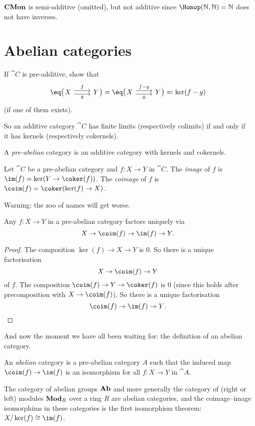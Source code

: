 \documentclass[../main.tex]{subfiles}
\begin{document}
\begin{exmp}
$\mathbf{CMon}$ is semi-additive (omitted), but not additive since $\Hom(\bb N, \bb N) = \bb N$ does not have inverses.
\end{exmp}

\section{Abelian categories}
\begin{exc}
  If $\cat C$ is pre-additive, show that \[
      \eq\bigl(\!\!\begin{tikzcd} X \ar[r, shift left, "f"] \ar[r, shift right, "g"'] & Y \end{tikzcd}\!\!\bigr) = \eq\bigl(\!\!\begin{tikzcd} X \ar[r, shift left, "f-g"] \ar[r, shift right, "0"'] & Y \end{tikzcd}\!\!\bigr) \eqcolon \ker(f-g)
    \] (if one of them exists).
\end{exc}
So an additive category $\cat C$ has finite limits (respectively colimits) if and only if it has kernels (respectively cokernels).
\begin{defn}
  A \emph{pre-abelian} category is an additive category with kernels and cokernels.
\end{defn}
\begin{defn}
  Let $\cat C$ be a pre-abelian category and $f\colon X \to Y$ in $\cat C$. The \emph{image} of $f$ is $\im(f) = \ker(Y \to \coker(f))$. The \emph{coimage} of $f$ is $\coim(f) = \coker(\ker(f) \to X)$.
\end{defn}
Warning: the zoo of names will get worse.
\begin{lem}
  Any $f\colon X \to Y$ in a pre-abelian category factors uniquely via \[
      X \to \coim(f) \to \im(f) \to Y\text{.}
    \]
\end{lem}
\begin{proof}
  The composition $\ker(f) \to X \to Y$ is $0$. So there is a unique factorisation \[
      X \to \coim(f) \to Y
    \] of $f$. The composition $\coim(f) \to Y \to \coker(f)$ is $0$ (since this holds after precomposition with $X \to \coim(f)$). So there is a unique factorisation \[
      \coim(f) \to \im(f) \to Y\text{.} \qedhere
    \]
\end{proof}
And now the moment we have all been waiting for: the definition of an abelian category.

\begin{defn}\label{defn:abelian-category}
  An \emph{abelian} category is a pre-abelian category $A$ such that the induced map $\coim(f) \to \im(f)$ is an isomorphism for all $f\colon X \to Y$ in $\cat A$.
\end{defn}
\begin{exmp}
  The category of abelian groups $\mathbf{Ab}$ and more generally the category of (right or left) modules $\catModule_R$ over a ring \(R\) are abelian categories, and the coimage--image isomorphims in these categories is the first isomorphism theorem: $X/\ker(f) \cong \im(f)$.
\end{exmp}
\end{document}

